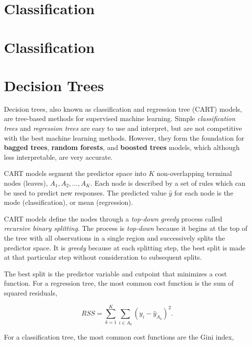 \documentclass[
]{book}
\begin{document}
\hypertarget{classification}{%
\chapter{Classification}\label{classification}}

\hypertarget{classification-1}{%
\chapter{Classification}\label{classification-1}}

\hypertarget{decision-trees}{%
\chapter{Decision Trees}\label{decision-trees}}

Decision trees, also known as classification and regression tree (CART) models, are tree-based methods for supervised machine learning. Simple \emph{classification trees} and \emph{regression trees} are easy to use and interpret, but are not competitive with the best machine learning methods. However, they form the foundation for \textbf{bagged trees}, \textbf{random forests}, and \textbf{boosted trees} models, which although less interpretable, are very accurate.

CART models segment the predictor space into \(K\) non-overlapping terminal nodes (leaves), \(A_1, A_2, \dots, A_K\). Each node is described by a set of rules which can be used to predict new responses. The predicted value \(\hat{y}\) for each node is the mode (classification), or mean (regression).

CART models define the nodes through a \emph{top-down greedy} process called \emph{recursive binary splitting}. The process is \emph{top-down} because it begins at the top of the tree with all observations in a single region and successively splits the predictor space. It is \emph{greedy} because at each splitting step, the best split is made at that particular step without consideration to subsequent splits.

The best split is the predictor variable and cutpoint that minimizes a cost function. For a regression tree, the most common cost function is the sum of squared residuals,

\[RSS = \sum_{k=1}^K\sum_{i \in A_k}{\left(y_i - \hat{y}_{A_k} \right)^2}.\]

For a classification tree, the most common cost functions are the Gini index,
\end{document}
